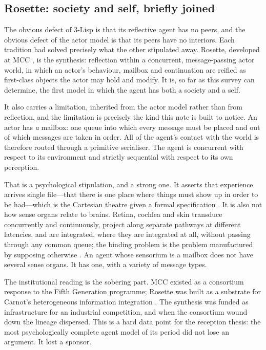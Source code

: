 \documentclass[11pt,a4paper]{article}
\begin{document}
\subsection{Rosette: society and self, briefly joined}

The obvious defect of 3-Lisp is that its reflective agent has no peers, and the
obvious defect of the actor model is that its peers have no interiors. Each
tradition had solved precisely what the other stipulated away. Rosette, developed
at MCC \cite{rosette1991,tomlinson1989}, is the synthesis: reflection within a
concurrent, message-passing actor world, in which an actor's behaviour, mailbox and
continuation are reified as first-class objects the actor may hold and modify. It
is, so far as this survey can determine, the first model in which the agent has
both a society and a self.

It also carries a limitation, inherited from the actor model rather than from
reflection, and the limitation is precisely the kind this note is built to
notice. An actor has \emph{a} mailbox: one queue into which every message must be
placed and out of which messages are taken in order. All of the agent's contact
with the world is therefore routed through a primitive serialiser. The agent is
concurrent with respect to its environment and strictly sequential with respect
to its own perception.

That is a psychological stipulation, and a strong one. It asserts that experience
arrives single file---that there is one place where things must show up in order
to be had---which is the Cartesian theatre given a formal specification
\cite{dennett1991}. It is also not how sense organs relate to brains. Retina,
cochlea and skin transduce concurrently and continuously, project along separate
pathways at different latencies, and are integrated, where they are integrated at
all, without passing through any common queue; the binding problem is the problem
manufactured by supposing otherwise \cite{treisman1980,malsburg1981}. An agent
whose sensorium is a mailbox does not have several sense organs. It has one, with
a variety of message types.

The institutional reading is the sobering part. MCC existed as a consortium
response to the Fifth Generation programme; Rosette was built as a substrate for
Carnot's heterogeneous information integration \cite{carnot1993}. The synthesis was
funded as infrastructure for an industrial competition, and when the consortium
wound down the lineage dispersed. This is a hard data point for the reception
thesis: the most psychologically complete agent model of its period did not lose an
argument. It lost a sponsor.
\end{document}

